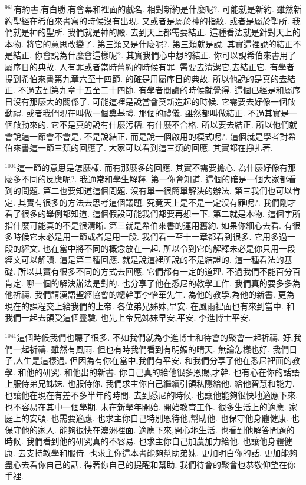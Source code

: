 \documentclass{book}
\begin{document}
$^{961}$有約書,有白勝,有會幕和裡面的戲名.
相對新約是什麼呢?.
可能就是新約.
雖然新約聖經在希伯來書寫的時候沒有出現.
又或者是屬於神的指紋.
或者是屬於聖所.
我們就是神的聖所.
我們就是神的殿.
去到天上都需要結正.
這種看法就是針對天上的本物.
將它的意思改變了.
第三類又是什麼呢?.
第三類就是說.
其實這裡說的結正不是結正.
你會說為什麼會這樣呢?.
其實我們心中想的結正.
你可以說希伯來書用了屬序日的典故.
人有罪或者當時舊約的時候有罪.
需要去清潔它,去結正它.
有學者提到希伯來書第九章六至十四節.
的確是用屬序日的典故.
所以他說的是真的去結正.
不過去到第九章十五至二十四節.
有學者閱讀的時候就覺得.
這個已經是和屬序日沒有那麼大的關係了.
可能這裡是說當會莫新造起的時候.
它需要去好像一個啟動禮.
或者我們現在叫做一個奠基禮.
那個的禮儀.
雖然都叫做結正.
不過其實是一個啟動來的.
它不是真的說有什麼污糟.
有什麼不合格.
所以要去結正.
所以他們就會說這一節會不會是.
不是說結正.
而是說一個啟用的模式呢?.
這個就是學者對希伯來書這一節三類的回應了.
大家可以看到這三類的回應.
其實都在掙扎著.

$^{1001}$這一節的意思是怎麼樣.
而有那麼多的回應.
其實不需要擔心.
為什麼好像有那麼多不同的反應呢?.
我通常和學生解釋.
第一你會知道.
這個的確是一個大家都看到的問題.
第二也要知道這個問題.
沒有單一很簡單解決的辦法.
第三我們也可以肯定.
其實有很多的方法去思考這個議題.
究竟天上是不是一定沒有罪呢?.
我們剛才看了很多的舉例都知道.
這個假設可能我們都要再想一下.
第二就是本物.
這個字所指什麼可能真的不是很清晰.
第三就是希伯來書的運用舊約.
如果你細心去看.
有很多時候它未必是用一節或者是用一段.
我們看一至十一章都看到很多.
它用多過一段的經文.
也在當中將不同的概念放在一起.
所以令到它的解釋未必是你只用一段經文可以解讀.
這是第三種回應.
就是說這裡所說的不是結證的.
這一種看法的基礎.
所以其實有很多不同的方式去回應.
它們都有一定的道理.
不過我們不能百分百肯定.
哪一個的解決辦法是對的.
也分享了他在悉尼的教學工作.
我們真的要多多為他祈禱.
我們請漢語聖經協會的總幹事李怡華先生.
為他的教學,為他的新書.
更為現在的課程交上給我們的上帝.
各位弟兄姊妹,早安.
在風雨裡面也有來到當中.
和我們一起去領受這個靈驗.
也先上帝兄姊妹早安,平安.
李進博士平安.

$^{1041}$這個時候我們也聽了很多.
不如我們就為李進博士和待會的聚會一起祈禱.
好,我們一起祈禱.
雖然有風雨.
但也有時我們看到有明媚的晴天.
無論怎樣也好.
我們日子,人生是這樣過.
但因為有你在當中,我們有平安.
和我們分享了他在悉尼裡面的教學.
和他的研究.
和他出的新書.
你自己真的給他很多恩賜,才幹.
也有心在你的話語上服侍弟兄姊妹.
也服侍你.
我們求主你自己繼續引領私隱給他.
給他智慧和能力.
也讓他在現在有差不多半年的時間.
去到悉尼的時候.
也讓他能夠很快地適應下來.
也不容易在其中一個學期.
未在新學年開始.
開始教育工作.
很多生活上的適應.
家庭上的安頓.
也需要適應.
也求主你自己特別恩待他,幫助他.
也保守他身體健康.
也保守他的家人.
能夠很快在澳洲裡面.
適應下來,開心地生活.
也看到他解答問題的時候.
我們看到他的研究真的不容易.
也求主你自己加農加力給他.
也讓他身體健康.
去支持教學和服侍.
也求主你這本書能夠幫助弟妹.
更加明白你的話.
更加能夠盡心去看你自己的話.
得著你自己的提醒和幫助.
我們待會的聚會也恭敬仰望在你手裡.
\end{document}
